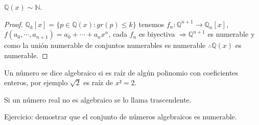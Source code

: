\begin{eg}
    $\mathbb{Q}(x) \sim \mathbb{N}$.
    \begin{proof}
        $\mathbb{Q}_k[x] = \{ p \in \mathbb{Q}(x) : gr(p) \leq k \}$ tenemos $f_n : \mathbb{Q}^{n+1} \to \mathbb{Q}_n[x]$, $f(a_0, \cdots, a_{n+1}) = a_0 + \cdots + a_nx^n$, cada $f_n$ es biyectiva $\Rightarrow \mathbb{Q}^{n+1}$ es numerable y como la unión numerable de conjuntos numerables es numerable $\therefore \mathbb{Q}(x)$ es numerable. 
    \end{proof}
\end{eg}

\begin{definition}
    Un número se dice algebraico si es raíz de algún polinomio con coeficientes enteros, por ejemplo $\sqrt{2}$ es raíz de $x² = 2$. 
\end{definition}

\begin{definition}
    Si un número real no es algebraico se lo llama trascendente.
\end{definition}

Ejercicio: demostrar que el conjunto de números algebraicos es numerable.